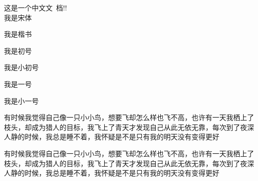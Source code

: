 \documentclass{article}
\begin{document}
\parindent=0pt
这是一个中文文~档!!\\
\songti 我是宋体\par
\kaishu 我是楷书\par
{}我是初号\par
{}我是小初号\par
{}我是一号\par
{}我是小一号\par
{}\par
  有时候我觉得自己像一只小小鸟，想要飞却怎么样也飞不高，也许有一天我栖上了枝头，却成为猎人的目标，我飞上了青天才发现自己从此无依无靠，每次到了夜深人静的时候，我总是睡不着，我怀疑是不是只有我的明天没有变得更好\par
  \renewcommand{\CJKglue}{\hskip 1pt}
  有时候我觉得自己像一只小小鸟，想要飞却怎么样也飞不高，也许有一天我栖上了枝头，却成为猎人的目标，我飞上了青天才发现自己从此无依无靠，每次到了夜深人静的时候，我总是睡不着，我怀疑是不是只有我的明天没有变得更好
\end{document}
